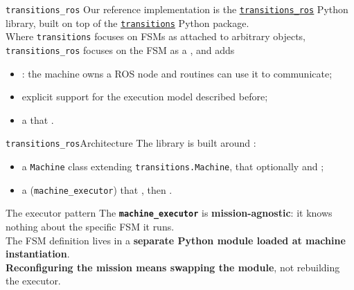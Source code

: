 \begin{frame}{\texttt{transitions\_ros}}
  \justifying
  Our reference implementation is the \href{https://github.com/dotX-Automation/transitions_ros}{\color{blue}\underline{\texttt{transitions\_ros}}} Python library, built on top of the \href{https://github.com/pytransitions/transitions}{\color{blue}\underline{\texttt{transitions}}} Python package.\\
  \bigskip
  Where \texttt{transitions} focuses on FSMs as  attached to arbitrary objects,\\\texttt{transitions\_ros} focuses on the FSM as a , and adds
  \begin{itemize}
    \item {}: the machine owns a ROS node and routines can use it to communicate;
    \item explicit support for the  execution model described before;
    \item a  that .
  \end{itemize}
\end{frame}
\begin{frame}{\texttt{transitions\_ros}}{Architecture}
  \justifying
  The library is built around :
  \begin{itemize}
    \item a \texttt{Machine} class extending \texttt{transitions.Machine}, that optionally  and ;
    \item a  (\texttt{machine\_executor}) that , then .
  \end{itemize}
  \bigskip
  \begin{block}{The executor pattern}
    \justifying
    The \textbf{\texttt{machine\_executor}} is \textbf{mission-agnostic}: it knows nothing about the specific FSM it runs.\\
    The FSM definition lives in a \textbf{separate Python module loaded at machine instantiation}.\\
    \textbf{Reconfiguring the mission means swapping the module}, not rebuilding the executor.
  \end{block}
\end{frame}
